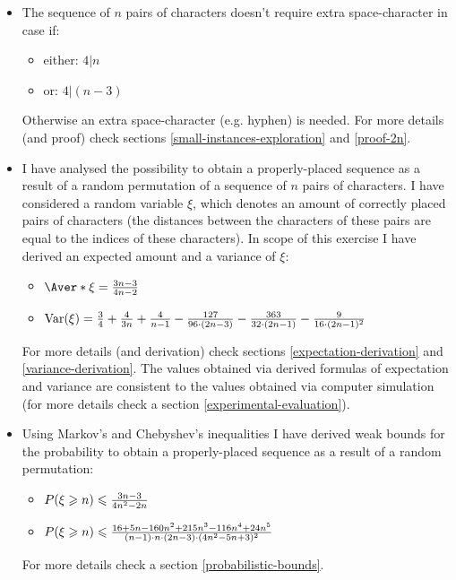 \documentclass{article}
\newcommand{\Var}{\mathrm{Var}}
\begin{document}
\begin{itemize}
	
	\item The sequence of $n$ pairs of characters doesn't require extra space-character in case if: 
		\begin{itemize}	
			\item either: $4 \vert n$ 
			\item or: $4 \vert (n-3)$
		\end{itemize}	
	Otherwise an extra space-character (e.g. hyphen) is needed. For more details (and proof) check sections \ref{small-instances-exploration} and \ref{proof-2n}.
	
	\item I have analysed the possibility to obtain a properly-placed sequence as a result of a random permutation of a sequence of $n$ pairs of characters. I have considered a random variable $\xi$, which denotes an amount of correctly placed pairs of characters (the distances between the characters of these pairs are equal to the indices of these characters). In scope of this exercise I have derived an expected amount and a variance of $\xi$:
		\begin{itemize}		
			\item $\Aver*{\xi} = {3n - 3 \over 4n - 2}$
			\item $\Var(\xi) = {3 \over 4} + {4 \over 3n} + {4 \over n - 1} - {127 \over 96 \cdot (2n - 3)} - {363 \over 32 \cdot (2n - 1)} - {9 \over 16 \cdot (2n - 1)^2}$
		\end{itemize}
	For more details (and derivation) check sections \ref{expectation-derivation} and \ref{variance-derivation}. The values obtained via derived formulas of expectation and variance are consistent to the values obtained via computer simulation (for more details check a section \ref{experimental-evaluation}).
	
	\item Using Markov's and Chebyshev's inequalities I have derived weak bounds for the probability to obtain a properly-placed sequence as a result of a random permutation:
		\begin{itemize}		
			\item $P(\xi \geqslant n) \leqslant {3n - 3 \over 4n^2 - 2n}$
			\item $P(\xi \geqslant n) \leqslant {16 + 5n - 160n^2 + 215n^3 - 116n^4 + 24n^5 \over (n - 1) \cdot n \cdot (2n - 3) \cdot (4n^2 - 5n + 3)^2}$
		\end{itemize}
	For more details check a section \ref{probabilistic-bounds}.
	

\end{itemize}
\end{document}
